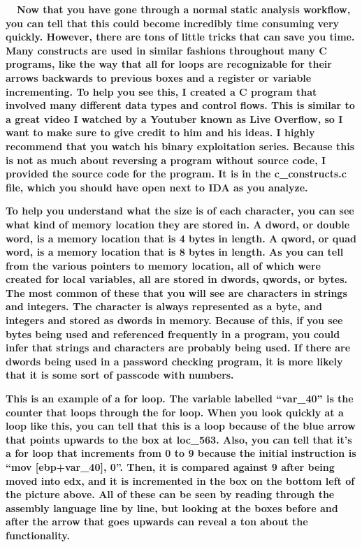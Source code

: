 \textbf{ \ \ Now that you have gone through a normal static analysis workflow, you can tell that this could become
incredibly time consuming very quickly. However, there are tons of little tricks that can save you time. Many
constructs are used in similar fashions throughout many C programs, like the way that all for loops are recognizable
for their arrows backwards to previous boxes and a register or variable incrementing. To help you see this, I created a
C program that involved many different data types and control flows. This is similar to a great video I watched by a
Youtuber known as Live Overflow, so I want to make sure to give credit to him and his ideas. I highly recommend that
you watch his binary exploitation series. Because this is not as much about reversing a program without source code, I
provided the source code  for the program. It is in the c\_constructs.c file, which you should have open next to IDA as
you analyze.}

  
 

\textbf{To help you understand what the size is of each character, you can see what kind of memory location they are
stored in. A dword, or double word, is a memory location that is 4 bytes in length. A qword, or quad word, is a memory
location that is 8 bytes in length. As you can tell from the various pointers to memory location, all of which were
created for local variables, all are stored in dwords, qwords, or bytes. The most common of these that you will see are
characters in strings and integers. The character is always represented as a byte, and integers and stored as dwords in
memory. Because of this, if you see bytes being used and referenced frequently in a program, you could infer that
strings and characters are probably being used. If there are dwords being used in a password checking program, it is
more likely that it is some sort of passcode with numbers.}

  
 

\textbf{This is an example of a for loop. The variable labelled ``var\_40'' is the counter that loops through the for
loop. When you look quickly at a loop like this, you can tell that this is a loop because of the blue arrow that points
upwards to the box at loc\_563. Also, you can tell that it's a for loop that increments from 0 to 9 because the initial
instruction is ``mov [ebp+var\_40], 0''. Then, it is compared against 9 after being moved into edx, and it is
incremented in the box on the bottom left of the picture above. All of these can be seen by reading through the
assembly language line by line, but looking at the boxes before and after the arrow that goes upwards can reveal a ton
about the functionality.}

